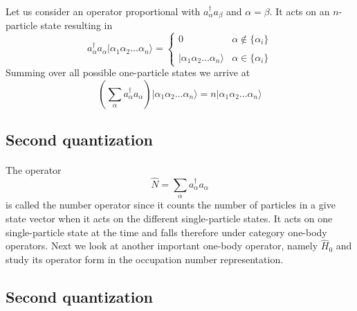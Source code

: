 \documentclass[%
twoside,                 %
final,                   %
10pt]{article}
\begin{document}
\paragraph{}
Let us consider an operator proportional with $a_\alpha^{\dagger} a_\beta$ and 
$\alpha=\beta$. It acts on an $n$-particle state 
resulting in
\begin{equation}
	a_\alpha^{\dagger} a_\alpha |\alpha_1\alpha_2 \dots \alpha_{n}\rangle = 
	\begin{cases}
		0  &\alpha \notin \{\alpha_i\} \\
		\\
		|\alpha_1\alpha_2 \dots \alpha_{n}\rangle & \alpha \in \{\alpha_i\}
	\end{cases}
\end{equation}
Summing over all possible one-particle states we arrive at
\begin{equation}
	\left( \sum_\alpha a_\alpha^{\dagger} a_\alpha \right) |\alpha_1\alpha_2 \dots \alpha_{n}\rangle = 
	n |\alpha_1\alpha_2 \dots \alpha_{n}\rangle \label{eq:2-21}
\end{equation}




\subsection{Second quantization}

\paragraph{}
The operator 
\begin{equation}
	\hat{N} = \sum_\alpha a_\alpha^{\dagger} a_\alpha \label{eq:2-22}
\end{equation}
is called the number operator since it counts the number of particles in a give state vector when it acts 
on the different single-particle states.  It acts on one single-particle state at the time and falls 
therefore under category one-body operators.
Next we look at another important one-body operator, namely $\hat{H}_0$ and study its operator form in the 
occupation number representation.




\subsection{Second quantization}
\end{document}
